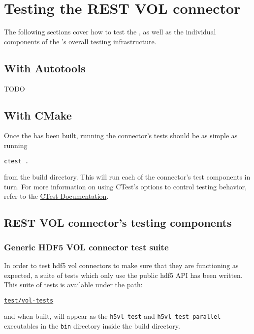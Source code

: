 \documentclass[../users_guide.tex]{subfiles}
\begin{document}
\section{Testing the REST VOL connector}

The following sections cover how to test the \rvc{}, as well as the individual
components of the \rvc's overall testing infrastructure.

\subsection{With Autotools}

TODO

\subsection{With CMake}

Once the \rvc{} has been built, running the connector's tests should be as simple as running

\begin{verbatim}
ctest .
\end{verbatim}

from the build directory. This will run each of the connector's test components in turn. For more
information on using CTest's options to control testing behavior, refer to the
\href{https://cmake.org/cmake/help/latest/manual/ctest.1.html}{CTest Documentation}.


\subsection{REST VOL connector's testing components}

\subsubsection{Generic HDF5 VOL connector test suite}

In order to test \acrshort{hdf5} \acrshort{vol} \glspl{connector} to make sure that they are
functioning as expected, a suite of tests which only use the public \acrshort{hdf5} API has
been written. This suite of tests is available under the path:

\href{https://bitbucket.hdfgroup.org/projects/HDF5VOL/repos/rest/browse/test}{\texttt{test/vol-tests}}

and when built, will appear as the \texttt{h5vl\_test} and \texttt{h5vl\_test\_parallel} executables in
the \texttt{bin} directory inside the build directory.
\end{document}
